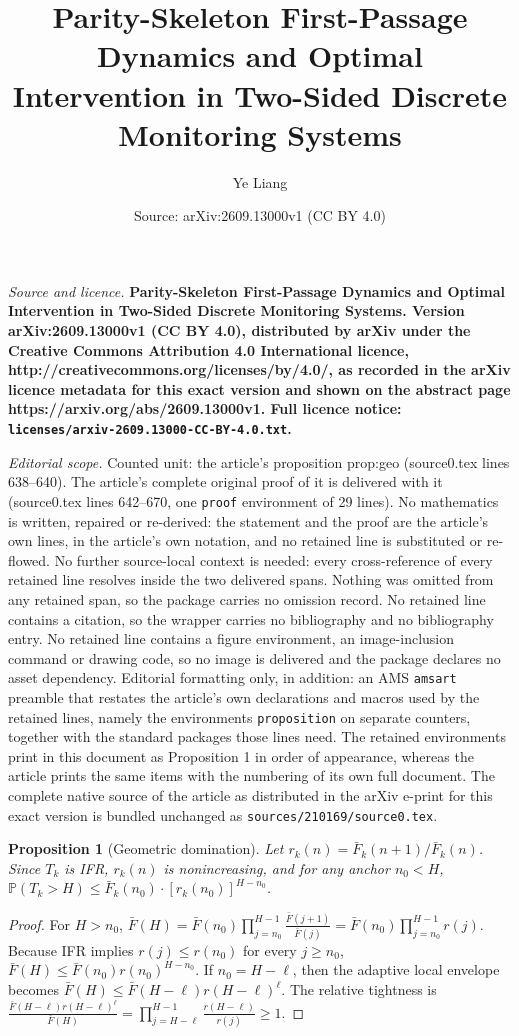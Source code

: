 \documentclass[10pt,a4paper]{amsart}
\title{\bf Parity-Skeleton First-Passage Dynamics and Optimal Intervention in Two-Sided Discrete Monitoring Systems}
\author{Ye Liang}
\date{Source: arXiv:2609.13000v1 (CC BY 4.0)}
\newtheorem{proposition}{Proposition}
\newcommand{\Prob}{\mathbb{P}}
\begin{document}
\maketitle

\noindent\emph{Source and licence.} \bf Parity-Skeleton First-Passage Dynamics and Optimal Intervention in Two-Sided Discrete Monitoring Systems. Version arXiv:2609.13000v1 (CC BY 4.0), distributed by arXiv under the Creative Commons Attribution 4.0 International licence, http://creativecommons.org/licenses/by/4.0/, as recorded in the arXiv licence metadata for this exact version and shown on the abstract page https://arxiv.org/abs/2609.13000v1. Full licence notice: \texttt{licenses/arxiv-2609.13000-CC-BY-4.0.txt}.\par\smallskip

\noindent\textit{Editorial scope.} Counted unit: the article's proposition prop:geo (source0.tex lines 638--640). The article's complete original proof of it is delivered with it (source0.tex lines 642--670, one \texttt{proof} environment of 29 lines). No mathematics is written, repaired or re-derived: the statement and the proof are the article's own lines, in the article's own notation, and no retained line is substituted or re-flowed.  No further source-local context is needed: every cross-reference of every retained line resolves inside the two delivered spans.  Nothing was omitted from any retained span, so the package carries no omission record.  No retained line contains a citation, so the wrapper carries no bibliography and no bibliography entry.  No retained line contains a figure environment, an image-inclusion command or drawing code, so no image is delivered and the package declares no asset dependency.  Editorial formatting only, in addition: an AMS \texttt{amsart} preamble that restates the article's own declarations and macros used by the retained lines, namely the environments \texttt{proposition} on separate counters, together with the standard packages those lines need.  The retained environments print in this document as Proposition 1 in order of appearance, whereas the article prints the same items with the numbering of its own full document.  The complete native source of the article as distributed in the arXiv e-print for this exact version is bundled unchanged as \texttt{sources/210169/source0.tex}.
\begin{proposition}[Geometric domination]\label{prop:geo}
Let $r_k(n)=\bar{F}_k(n{+}1)/\bar{F}_k(n)$. Since $T_k$ is IFR, $r_k(n)$ is nonincreasing, and for any anchor $n_0{<}H$, $\Prob(T_k{>}H)\le\bar{F}_k(n_0)\cdot[r_k(n_0)]^{H-n_0}$.
\end{proposition}

\begin{proof}
For \(H>n_0\),
$\displaystyle \bar F(H)
=
\bar F(n_0)
\prod_{j=n_0}^{H-1}
\frac{\bar F(j+1)}{\bar F(j)}
=
\bar F(n_0)
\prod_{j=n_0}^{H-1}r(j)$.
Because IFR implies \(r(j)\le r(n_0)\) for every \(j\ge n_0\),
$\displaystyle \bar F(H)
\le
\bar F(n_0)r(n_0)^{H-n_0}$.
If \(n_0=H-\ell\), then the adaptive local envelope becomes
$\displaystyle \bar F(H)
\le
\bar F(H-\ell)r(H-\ell)^\ell$.
The relative tightness is
$\displaystyle \frac{
\bar F(H-\ell)r(H-\ell)^\ell
}{
\bar F(H)
}
=
\prod_{j=H-\ell}^{H-1}
\frac{r(H-\ell)}{r(j)}
\ge 1$.
\end{proof}
\end{document}
